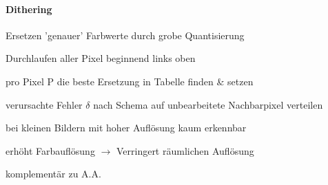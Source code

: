 \documentclass[landscape]{article}
\begin{document}
\begin{multicols}{3}
  \paragraph{Dithering}
  \begin{itemize*}
    \item Ersetzen 'genauer' Farbwerte durch grobe Quantisierung
    \item Durchlaufen aller Pixel beginnend links oben
    \item pro Pixel P die beste Ersetzung in Tabelle finden \& setzen
    \item verursachte Fehler $\delta$ nach Schema auf unbearbeitete Nachbarpixel verteilen
    \item bei kleinen Bildern mit hoher Auflösung kaum erkennbar
    \item erhöht Farbauflösung $\rightarrow$ Verringert räumlichen Auflösung
    \item komplementär zu A.A.
  \end{itemize*}
  
\end{multicols}
\newpage
\end{document}
